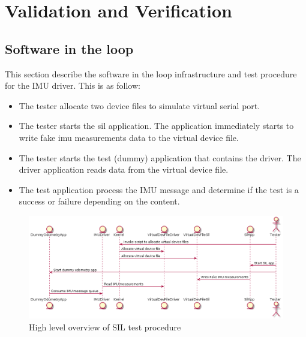 \section{Validation and Verification}
\subsection{Software in the loop}
This section describe the software in the loop infrastructure and test procedure for the IMU driver. This is as follow:
\begin{itemize}
    \item The tester allocate two device files to simulate virtual serial port.
    \item The tester starts the sil application. The application immediately starts to write fake imu measurements data to the virtual device file.
    \item The tester starts the test (dummy) application that contains the driver. The driver application reads data from the virtual device file.
    \item The test application process the IMU message and determine if the test is a success or failure depending on the content.
\end{itemize}



\begin{figure}[ht]
    \centering
    \includegraphics[width=0.75 \textwidth]{diagrams/software_in_the_loop.png}
    \caption{High level overview of SIL test procedure}
    \label{reference}
\end{figure}
